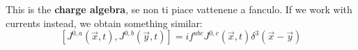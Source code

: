 \documentclass[../main.tex]{subfiles}
\begin{document}
This is the \textbf{charge algebra}, se non ti piace vattenene a fanculo. If we work with currents instead, we obtain something similar:
\[
[J^{0,a}(\Vec{x},t),J^{0,b}(\Vec{y},t)]=if^{abc}J^{0,c}(\Vec{x},t)\delta^3(\Vec{x}-\Vec{y})
\]
\end{document}
